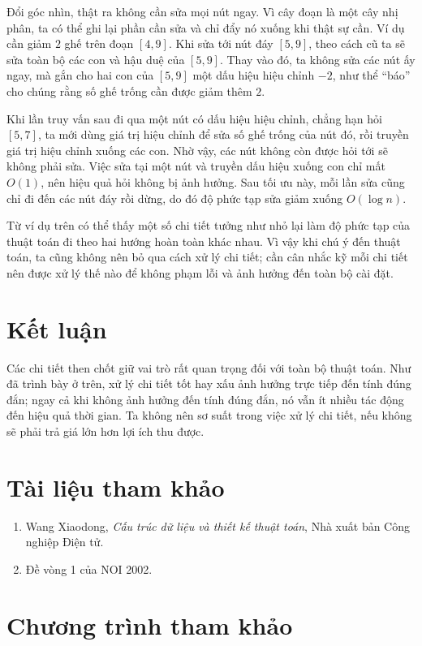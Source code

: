 \documentclass[11pt]{article}
\begin{document}
Đổi góc nhìn, thật ra không cần sửa mọi nút ngay. Vì cây đoạn là một cây nhị
phân, ta có thể ghi lại phần cần sửa và chỉ đẩy nó xuống khi thật sự cần. Ví
dụ cần giảm $2$ ghế trên đoạn $[4,9]$. Khi sửa tới nút đáy $[5,9]$, theo
cách cũ ta sẽ sửa toàn bộ các con và hậu duệ của $[5,9]$. Thay vào đó, ta
không sửa các nút ấy ngay, mà gắn cho hai con của $[5,9]$ một dấu hiệu hiệu
chỉnh $-2$, như thể ``báo'' cho chúng rằng số ghế trống cần được giảm thêm
$2$.

Khi lần truy vấn sau đi qua một nút có dấu hiệu hiệu chỉnh, chẳng hạn hỏi
$[5,7]$, ta mới dùng giá trị hiệu chỉnh để sửa số ghế trống của nút đó, rồi
truyền giá trị hiệu chỉnh xuống các con. Nhờ vậy, các nút không còn được hỏi
tới sẽ không phải sửa. Việc sửa tại một nút và truyền dấu hiệu xuống con chỉ
mất $O(1)$, nên hiệu quả hỏi không bị ảnh hưởng. Sau tối ưu này, mỗi lần sửa
cũng chỉ đi đến các nút đáy rồi dừng, do đó độ phức tạp sửa giảm xuống
$O(\log n)$.

Từ ví dụ trên có thể thấy một số chi tiết tưởng như nhỏ lại làm độ phức tạp
của thuật toán đi theo hai hướng hoàn toàn khác nhau. Vì vậy khi chú ý đến
thuật toán, ta cũng không nên bỏ qua cách xử lý chi tiết; cần cân nhắc kỹ mỗi
chi tiết nên được xử lý thế nào để không phạm lỗi và ảnh hưởng đến toàn bộ
cài đặt.

\section{Kết luận}

Các chi tiết then chốt giữ vai trò rất quan trọng đối với toàn bộ thuật toán.
Như đã trình bày ở trên, xử lý chi tiết tốt hay xấu ảnh hưởng trực tiếp đến
tính đúng đắn; ngay cả khi không ảnh hưởng đến tính đúng đắn, nó vẫn ít nhiều
tác động đến hiệu quả thời gian. Ta không nên sơ suất trong việc xử lý chi
tiết, nếu không sẽ phải trả giá lớn hơn lợi ích thu được.

\section*{Tài liệu tham khảo}
\begin{enumerate}
  \item Wang Xiaodong, \emph{Cấu trúc dữ liệu và thiết kế thuật toán}, Nhà
  xuất bản Công nghiệp Điện tử.
  \item Đề vòng 1 của NOI 2002.
\end{enumerate}

\section*{Chương trình tham khảo}
\end{document}

